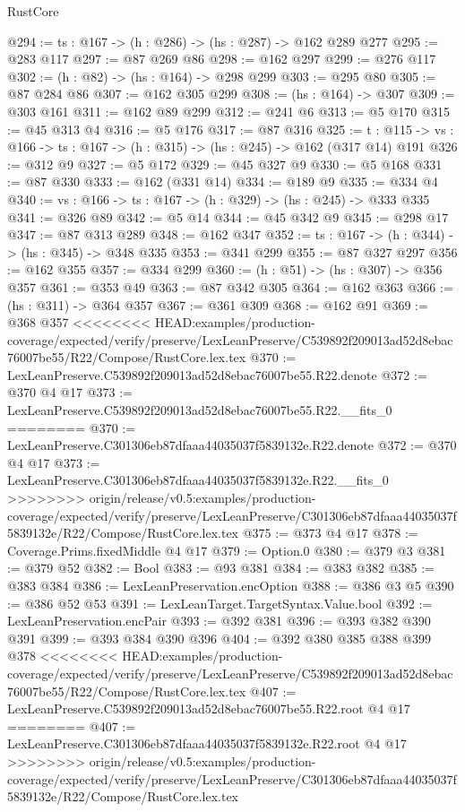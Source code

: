 \begin{lexlean}{RustCore}
\begin{coremodule}
{\begin{coremodule}
@294 := {ts : @167} -> (h : @286) -> (hs : @287) -> @162 @289 @277
@295 := @283 @117
@297 := @87 @269 @86
@298 := @162 @297
@299 := @276 @117
@302 := (h : @82) -> (hs : @164) -> @298 @299
@303 := @295 @80
@305 := @87 @284 @86
@307 := @162 @305 @299
@308 := (hs : @164) -> @307
@309 := @303 @161
@311 := @162 @89 @299
@312 := @241 @6
@313 := @5 @170
@315 := @45 @313 @4
@316 := @5 @176
@317 := @87 @316
@325 := {t : @115} ->
  {vs : @166} -> {ts : @167} -> (h : @315) -> (hs : @245) -> @162 (@317 @14) @191
@326 := @312 @9
@327 := @5 @172
@329 := @45 @327 @9
@330 := @5 @168
@331 := @87 @330
@333 := @162 (@331 @14)
@334 := @189 @9
@335 := @334 @4
@340 := {vs : @166} -> {ts : @167} -> (h : @329) -> (hs : @245) -> @333 @335
@341 := @326 @89
@342 := @5 @14
@344 := @45 @342 @9
@345 := @298 @17
@347 := @87 @313 @289
@348 := @162 @347
@352 := {ts : @167} -> (h : @344) -> (hs : @345) -> @348 @335
@353 := @341 @299
@355 := @87 @327 @297
@356 := @162 @355
@357 := @334 @299
@360 := (h : @51) -> (hs : @307) -> @356 @357
@361 := @353 @49
@363 := @87 @342 @305
@364 := @162 @363
@366 := (hs : @311) -> @364 @357
@367 := @361 @309
@368 := @162 @91
@369 := @368 @357
<<<<<<<< HEAD:examples/production-coverage/expected/verify/preserve/LexLeanPreserve/C539892f209013ad52d8ebac76007be55/R22/Compose/RustCore.lex.tex
@370 := LexLeanPreserve.C539892f209013ad52d8ebac76007be55.R22.denote
@372 := @370 @4 @17
@373 := LexLeanPreserve.C539892f209013ad52d8ebac76007be55.R22.__fits_0
========
@370 := LexLeanPreserve.C301306eb87dfaaa44035037f5839132e.R22.denote
@372 := @370 @4 @17
@373 := LexLeanPreserve.C301306eb87dfaaa44035037f5839132e.R22.__fits_0
>>>>>>>> origin/release/v0.5:examples/production-coverage/expected/verify/preserve/LexLeanPreserve/C301306eb87dfaaa44035037f5839132e/R22/Compose/RustCore.lex.tex
@375 := @373 @4 @17
@378 := Coverage.Prims.fixedMiddle @4 @17
@379 := Option.{0}
@380 := @379 @3
@381 := @379 @52
@382 := Bool
@383 := @93 @381
@384 := @383 @382
@385 := @383 @384
@386 := LexLeanPreservation.encOption
@388 := @386 @3 @5
@390 := @386 @52 @53
@391 := LexLeanTarget.TargetSyntax.Value.bool
@392 := LexLeanPreservation.encPair
@393 := @392 @381
@396 := @393 @382 @390 @391
@399 := @393 @384 @390 @396
@404 := @392 @380 @385 @388 @399 @378
<<<<<<<< HEAD:examples/production-coverage/expected/verify/preserve/LexLeanPreserve/C539892f209013ad52d8ebac76007be55/R22/Compose/RustCore.lex.tex
@407 := LexLeanPreserve.C539892f209013ad52d8ebac76007be55.R22.root @4 @17
========
@407 := LexLeanPreserve.C301306eb87dfaaa44035037f5839132e.R22.root @4 @17
>>>>>>>> origin/release/v0.5:examples/production-coverage/expected/verify/preserve/LexLeanPreserve/C301306eb87dfaaa44035037f5839132e/R22/Compose/RustCore.lex.tex

\end{coremodule}}
\end{coremodule}
\end{lexlean}
